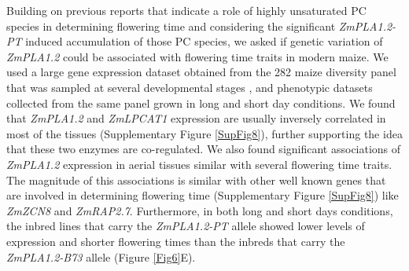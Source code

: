 \documentclass[9pt,twocolumn,twoside,lineno]{BioRxiv}
\begin{document}
Building on previous reports that indicate a role of highly unsaturated PC species in determining flowering time \cite{Nakamura2014-qf, Riedelsheimer2013-bd} and considering the significant \textit{ZmPLA1.2-PT} induced accumulation of those PC species, we asked if genetic variation of \textit{ZmPLA1.2} could be associated with flowering time traits in modern maize. 
We used a large gene expression dataset obtained from the 282 maize diversity panel that was sampled at several developmental stages \cite{Kremling2018-gn}, and phenotypic datasets collected from the same panel grown in long and short day conditions.
We found that \textit{ZmPLA1.2} and \textit{ZmLPCAT1} expression are usually inversely correlated in most of the tissues (Supplementary Figure \ref{SupFig8}), further supporting the idea that these two enzymes are co-regulated. 
We also found significant associations of \textit{ZmPLA1.2} expression in aerial tissues similar with several flowering time traits. 
The magnitude of this associations is similar with other well known genes that are involved in determining flowering time (Supplementary Figure \ref{SupFig8}) like \textit{ZmZCN8} and \textit{ZmRAP2.7}.
Furthermore, in both long and short days conditions, the inbred lines that carry the \textit{ZmPLA1.2-PT} allele showed lower levels of expression and shorter flowering times than the inbreds that carry the \textit{ZmPLA1.2-B73} allele  (Figure \ref{Fig6}E). 
\end{document}

